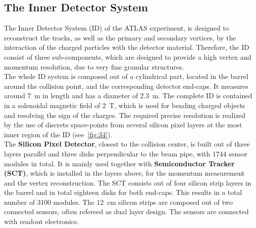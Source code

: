 \subsection{The Inner Detector System}\label{ID}
The Inner Detector System (ID) of the ATLAS experiment, is designed to reconstruct the tracks, as well as the primary and secondary vertices, by the interaction of the charged particles with the detector material. Therefore, the ID consist of three sub-components, which are designed to provide a high vertex and momentum resolution, due to  very fine granular structures.\\

\noindent The whole ID system is composed out of a cylindrical part, located in the barrel around the collision point, and the corresponding detector end-caps. It measures around 7~m in length and has a diameter of 2.3~m. The complete ID is contained in a solenoidal magnetic field of 2~T, which is used for bending charged objects and resolving the sign of the charges. The required precise resolution is realized by the use of discrete space-points from several silicon pixel layers at the most inner region of the ID (see~\cref{fig:34}).\\

\noindent The \textbf{Silicon Pixel Detector}, closest to the collision center, is built out of three layers parallel and three disks perpendicular to the beam pipe, with 1744 sensor modules in total. It is mainly used together with \textbf{Semiconductor Tracker (SCT)}, which is installed in the layers above, for the momentum measurement and the vertex reconstruction. The SCT consists out of four silicon strip layers in the barrel and in total eighteen disks for both end-caps. This results in a total number of 3100 modules. The 12~cm silicon strips are composed out of two connected sensors, often refereed as dual layer design. The sensors are connected with readout electronics.\\


